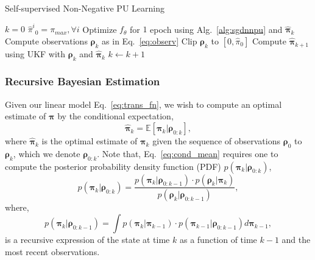 \begin{algorithm}[t]
\caption{Self-supervised Non-Negative PU Learning}
\label{alg:prior_estim}
\begin{algorithmic}[1]
\State $k = 0$
\State $ {\hat{\pi}^i}_{0} = \pi_{max}, \forall i$
    \State Optimize $f_\theta$ for $1$ epoch using Alg.~\ref{alg:sgdnnpu} and $\bm{\hat{\pi}}_{k}$
    \State Compute observations $\bm{\rho}_k$ as in Eq.~\eqref{eq:observ}
    \State Clip $\bm{\rho}_{k}$ to $[0,\hat \pi_{0}]$
    \State Compute $\bm{\hat\pi}_{k+1}$ using UKF with $\bm{\rho}_{k}$ and $\bm{\hat\pi}_{k}$
    \State	 $k \gets k+1$
\EndWhile
\end{algorithmic}
\end{algorithm}

\subsubsection{Recursive Bayesian Estimation}
Given our linear model Eq.~\eqref{eq:trans_fn}, we wish to compute an optimal estimate of $\bm\pi$ by the conditional expectation,
\begin{equation}
  \label{eq:cond_mean}
\bm{\hat\pi}_{k} = \mathbb{E}[\bm{\pi}_{k} | \bm{\rho}_{0:k}],
\end{equation}
\noindent
where $\bm{\hat\pi}_k$ is the optimal estimate of $\bm{\pi}_{k}$ given the sequence of observations $\bm{\rho}_{0}$ to $\bm{\rho}_{k}$, which we denote $\bm{\rho}_{0:k}$. Note that, Eq.~\eqref{eq:cond_mean} requires one to compute the posterior probability density function (PDF) $p(\bm{\pi}_{k}|\bm{\rho}_{0:k})$, 
\begin{equation}
  \label{eq:aposteriori}
  p(\bm{\pi}_{k}|\bm{\rho}_{0:k}) = \frac{p(\bm{\pi}_{k}|\bm{\rho}_{0:k-1})\cdot p(\bm{\rho}_{k}|\bm{\pi}_{k})}{p(\bm{\rho}_{k}|\bm{\rho}_{0:k-1})},
\end{equation}
\noindent where,
\begin{equation}
  \label{eq:prior}
  p(\bm{\pi}_{k}|\bm{\rho}_{0:k-1}) = \int p(\bm{\pi}_{k}|\bm{\pi}_{k-1}) \cdot p(\bm{\pi}_{k-1}|\bm{\rho}_{0:k-1}) d\bm{\pi}_{k-1},
\end{equation}
\noindent
is a recursive expression of the state at time $k$ as a function of time $k-1$ and the most recent observations.

